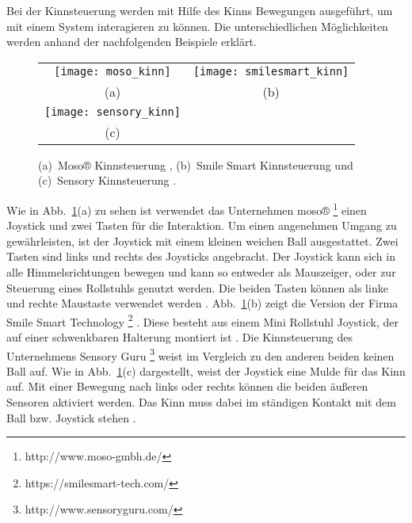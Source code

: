 Bei der Kinnsteuerung werden mit Hilfe des Kinns Bewegungen ausgeführt, um mit einem System interagieren zu können. Die unterschiedlichen Möglichkeiten werden anhand der nachfolgenden Beispiele erklärt.
%
\begin{figure}
\centering\small
\setlength{\tabcolsep}{0mm}	%
\begin{tabular}{c@{\hspace{15mm}}c} %
  \texttt{[image: moso\_kinn]} &
  \texttt{[image: smilesmart\_kinn]}
\\
  (a) & (b)
\\[5pt]	%
  \texttt{[image: sensory\_kinn]}
\\
  (c)
\end{tabular}
%
\caption{(a)~Moso® Kinnsteuerung \cite{MOSO}, (b)~Smile Smart Kinnsteuerung \cite{SMILESMART} und (c)~Sensory Kinnsteuerung \cite{SENSORY}.}
\label{fig:kinn}
\end{figure}
\newline \newline
Wie in Abb.~\ref{fig:kinn}(a) zu sehen ist verwendet das Unternehmen moso®%
\footnote{http://www.moso-gmbh.de/}
%
einen Joystick und zwei Tasten für die Interaktion. Um einen angenehmen Umgang zu gewährleisten, ist der Joystick mit einem kleinen weichen Ball ausgestattet. Zwei Tasten sind links und rechts des Joysticks angebracht. Der Joystick kann sich in alle Himmelsrichtungen bewegen und kann so entweder als Mauszeiger, oder zur Steuerung eines Rollstuhls genutzt werden. Die beiden Tasten können als linke und rechte Maustaste verwendet werden \cite{MOSO}.
\newline \newline
Abb.~\ref{fig:kinn}(b) zeigt die Version der Firma Smile Smart Technology%
\footnote{https://smilesmart-tech.com/}
%
. Diese besteht aus einem Mini Rollstuhl Joystick, der auf einer schwenkbaren Halterung montiert ist \cite{SMILESMART}.
\newline \newline
Die Kinnsteuerung des Unternehmens Sensory Guru%
\footnote{http://www.sensoryguru.com/}
%
weist im Vergleich zu den anderen beiden keinen Ball auf. Wie in Abb.~\ref{fig:kinn}(c) dargestellt, weist der Joystick eine Mulde für das Kinn auf. Mit einer Bewegung nach links oder rechts können die beiden äußeren Sensoren aktiviert werden. Das Kinn muss dabei im ständigen Kontakt mit dem Ball bzw. Joystick stehen \cite{SENSORY}. 
